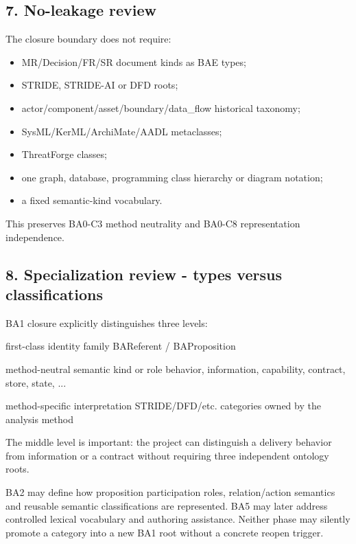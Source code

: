 \documentclass[
  10pt,
  a4paper,
]{article}
\newenvironment{Shaded}{}{}
\newcommand{\NormalTok}[1]{#1}
\providecommand{\tightlist}{%
  \setlength{\itemsep}{0pt}\setlength{\parskip}{0pt}}
\begin{document}
\subsection{7. No-leakage review}\label{no-leakage-review}

The closure boundary does not require:

\begin{itemize}
\tightlist
\item
  MR/Decision/FR/SR document kinds as BAE types;
\item
  STRIDE, STRIDE-AI or DFD roots;
\item
  actor/component/asset/boundary/data\_flow historical taxonomy;
\item
  SysML/KerML/ArchiMate/AADL metaclasses;
\item
  ThreatForge classes;
\item
  one graph, database, programming class hierarchy or diagram notation;
\item
  a fixed semantic-kind vocabulary.
\end{itemize}

This preserves BA0-C3 method neutrality and BA0-C8 representation
independence.

\subsection{8. Specialization review - types versus
classifications}\label{specialization-review---types-versus-classifications}

BA1 closure explicitly distinguishes three levels:

\begin{Shaded}
\begin{Highlighting}[]
\NormalTok{first{-}class identity family}
\NormalTok{    BAReferent / BAProposition}

\NormalTok{method{-}neutral semantic kind or role}
\NormalTok{    behavior, information, capability, contract, store, state, ...}

\NormalTok{method{-}specific interpretation}
\NormalTok{    STRIDE/DFD/etc. categories owned by the analysis method}
\end{Highlighting}
\end{Shaded}

The middle level is important: the project can distinguish a delivery
behavior from information or a contract without requiring three
independent ontology roots.

BA2 may define how proposition participation roles, relation/action
semantics and reusable semantic classifications are represented. BA5 may
later address controlled lexical vocabulary and authoring assistance.
Neither phase may silently promote a category into a new BA1 root
without a concrete reopen trigger.
\end{document}
